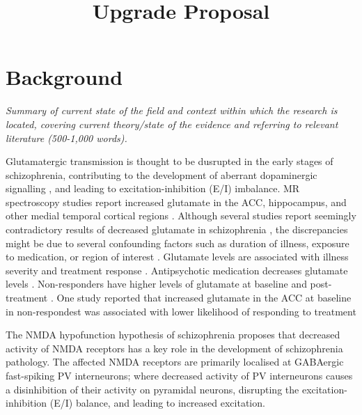 \documentclass[
  letterpaper,
  DIV=11,
  numbers=noendperiod]{scrartcl}
\title{Upgrade Proposal}
\author{Julia Marcinkowska \and  \and }
\date{}
\begin{document}
\maketitle

\section{Background}\label{background}

\emph{Summary of current state of the field and context within which the
research is located, covering current theory/state of the evidence and
referring to relevant literature (500-1,000 words).}

Glutamatergic transmission is thought to be dusrupted in the early
stages of schizophrenia, contributing to the development of aberrant
dopaminergic signalling
\autocite{grace_dopamine_2012,grace_dysregulation_2016}, and leading to
excitation-inhibition (E/I) imbalance. MR spectroscopy studies report
increased glutamate in the ACC, hippocampus, and other medial temporal
cortical regions
\autocite{merritt_nature_2017,kraguljac_increased_2013,marsman_glutamate_2013,nakahara_glutamatergic_2022}.
Although several studies report seemingly contradictory results of
decreased glutamate in schizophrenia
\autocite{jeon_progressive_2021,merritt_nature_2017}, the discrepancies
might be due to several confounding factors such as duration of illness,
exposure to medication, or region of interest
\autocite{nakahara_glutamatergic_2022}. Glutamate levels are associated
with illness severity and treatment response
\autocite{merritt_nature_2017}. Antipsychotic medication decreases
glutamate levels
\autocite{bojesen_treatment_2020,jeon_progressive_2021,egerton_effects_2017}.
Non-responders have higher levels of glutamate at baseline
\autocite{fan_glutamatergic_2024,reyes-madrigal_striatal_2022} and
post-treatment \autocite{reyes-madrigal_striatal_2022}. One study
reported that increased glutamate in the ACC at baseline in
non-respondest was associated with lower likelihood of responding to
treatment \autocite{egerton_response_2018}

The NMDA hypofunction hypothesis of schizophrenia proposes that
decreased activity of NMDA receptors has a key role in the development
of schizophrenia pathology. The affected NMDA receptors are primarily
localised at GABAergic fast-spiking PV
interneurons\autocite{nakazawa_spatial_2017}; where decreased activity
of PV interneurons causes a disinhibition of their activity on pyramidal
neurons, disrupting the excitation-inhibition (E/I) balance, and leading
to increased excitation.
\end{document}
